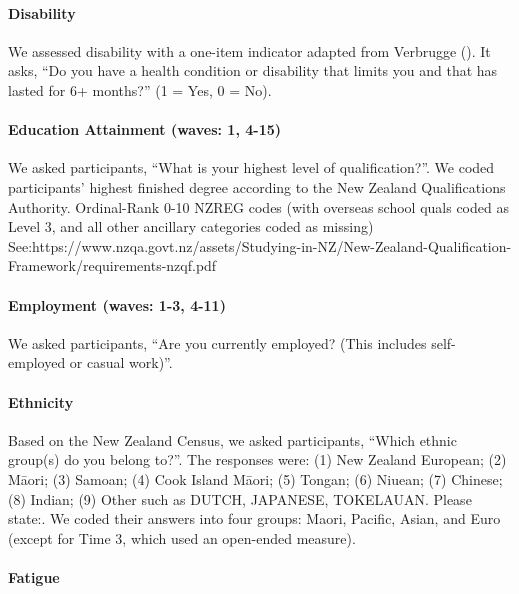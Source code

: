 \documentclass[
  single column]{article}
\let\oldparagraph\paragraph
\renewcommand{\paragraph}[1]{\oldparagraph{#1}\mbox{}}
\begin{document}
\paragraph{Disability}\label{disability}

We assessed disability with a one-item indicator adapted from Verbrugge
(). It asks, ``Do you have a health
condition or disability that limits you and that has lasted for 6+
months?'' (1 = Yes, 0 = No).

\paragraph{Education Attainment (waves: 1,
4-15)}\label{education-attainment-waves-1-4-15}

We asked participants, ``What is your highest level of qualification?''.
We coded participants' highest finished degree according to the New
Zealand Qualifications Authority. Ordinal-Rank 0-10 NZREG codes (with
overseas school quals coded as Level 3, and all other ancillary
categories coded as missing)
See:https://www.nzqa.govt.nz/assets/Studying-in-NZ/New-Zealand-Qualification-Framework/requirements-nzqf.pdf

\paragraph{Employment (waves: 1-3,
4-11)}\label{employment-waves-1-3-4-11}

We asked participants, ``Are you currently employed? (This includes
self-employed or casual work)''.

\paragraph{Ethnicity}\label{ethnicity}

Based on the New Zealand Census, we asked participants, ``Which ethnic
group(s) do you belong to?''. The responses were: (1) New Zealand
European; (2) Māori; (3) Samoan; (4) Cook Island Māori; (5) Tongan; (6)
Niuean; (7) Chinese; (8) Indian; (9) Other such as DUTCH, JAPANESE,
TOKELAUAN. Please state:. We coded their answers into four groups:
Maori, Pacific, Asian, and Euro (except for Time 3, which used an
open-ended measure).

\paragraph{Fatigue}\label{fatigue}
\end{document}
